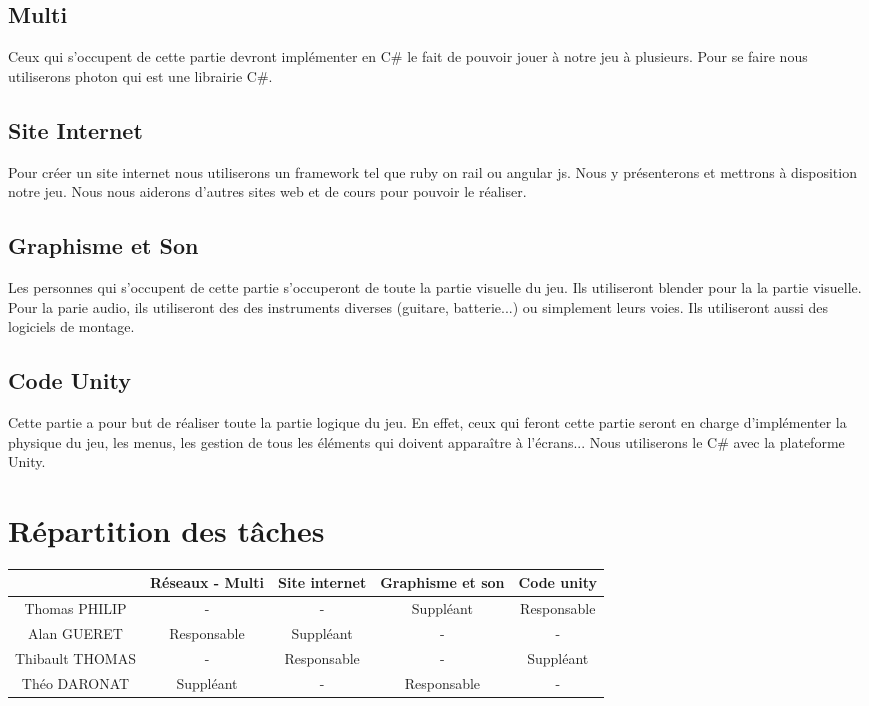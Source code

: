 \documentclass[12pt]{report}
\begin{document}
		\subsection{Multi}
Ceux qui s'occupent de cette partie devront implémenter en C\# le 
fait de pouvoir jouer à notre jeu à plusieurs. Pour se faire nous
utiliserons photon qui est une librairie C\#. 

		\subsection{Site Internet}
Pour créer un site internet nous utiliserons un framework tel que
ruby on rail ou angular js. Nous y présenterons et mettrons à
disposition notre jeu. Nous nous aiderons d'autres sites web et 
de cours pour pouvoir le réaliser.

		\subsection{Graphisme et Son}
Les personnes qui s'occupent de cette partie s'occuperont de
toute la partie visuelle du jeu. Ils utiliseront blender pour la
la partie visuelle. Pour la parie audio, ils utiliseront des
des instruments diverses (guitare, batterie...) ou simplement
leurs voies. Ils utiliseront aussi des logiciels de montage.\\
		\subsection{Code Unity}
Cette partie a pour but de réaliser toute la partie logique du
jeu. En effet, ceux qui feront cette partie seront en charge
d'implémenter la physique du jeu, les menus, les gestion de 
tous les éléments qui doivent apparaître à l'écrans... Nous
utiliserons le C\# avec la plateforme Unity.\\

	\section{Répartition des tâches}	
	
	\begin{tabular}{|*{5}{c|}}
	\hline
		& Réseaux - Multi & Site internet & Graphisme et son & Code unity \\
		\hline
		Thomas PHILIP & - & - & Suppléant & Responsable \\
		\hline
		Alan GUERET & Responsable & Suppléant & - & - \\
		\hline
		Thibault THOMAS & - & Responsable & - & Suppléant \\
		\hline
		Théo DARONAT & Suppléant & - & Responsable & - \\
		\hline
	
	\end{tabular}
	\\
	\\
	
\end{document}
